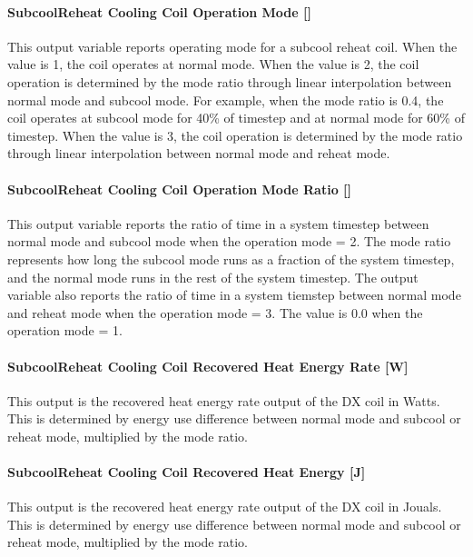 \paragraph{SubcoolReheat Cooling Coil Operation Mode {[]}}\label{subcoolreheat-cooling-coil-operation-mode}

This output variable reports operating mode for a subcool reheat coil. When the value is 1, the coil operates at normal mode. When the value is 2, the coil operation is determined by the mode ratio through linear interpolation between normal mode and subcool mode. For example, when the mode ratio is 0.4, the coil operates at subcool mode for 40\% of timestep and at normal mode for 60\% of timestep. When the value is 3, the coil operation is determined by the mode ratio through linear interpolation between normal mode and reheat mode.

\paragraph{SubcoolReheat Cooling Coil Operation Mode Ratio {[]}}\label{subcoolreheat-cooling-coil-operation-mode-ratio}

This output variable reports the ratio of time in a system timestep between normal mode and subcool mode when the operation mode = 2. The mode ratio represents how long the subcool mode runs as a fraction of the system timestep, and the normal mode runs in the rest of the system timestep. The output variable also reports the ratio of time in a system tiemstep between normal mode and reheat mode when the operation mode = 3. The value is 0.0 when the operation mode = 1.

\paragraph{SubcoolReheat Cooling Coil Recovered Heat Energy Rate {[}W{]}}\label{subcoolreheat-cooling-coil-recovered-heat-energy-rate-w}

This output is the recovered heat energy rate output of the DX coil in Watts. This is determined by energy use difference between normal mode and subcool or reheat mode, multiplied by the mode ratio.

\paragraph{SubcoolReheat Cooling Coil Recovered Heat Energy {[}J{]}}\label{subcoolreheat-cooling-coil-recovered-heat-energy-j}

This output is the recovered heat energy rate output of the DX coil in Jouals. This is determined by energy use difference between normal mode and subcool or reheat mode, multiplied by the mode ratio.

